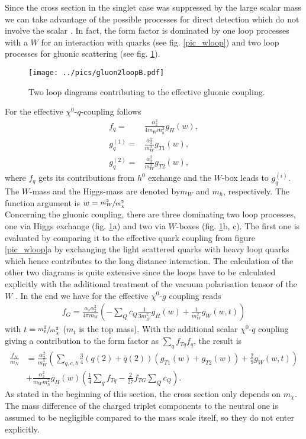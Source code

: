 Since the cross section in the singlet case was suppressed by the large scalar mass we can take advantage of the possible 
processes for direct detection which do not involve the scalar \cite{1004.4090}. In fact, the form factor is dominated by one loop processes with a 
$W$ for an interaction with quarks (see fig. \ref{pic_wloop}) and two loop processes for gluonic scattering (see fig. \ref{pic_2loopgluon}).
\begin{figure}[t]
 \texttt{[image: ../pics/gluon2loopB.pdf]}
 \caption{Two loop diagrams contributing to the effective gluonic coupling.}
 \label{pic_2loopgluon}
\end{figure}
For the effective $\chi^0$-$q$-coupling follows
\begin{align}
 f_q =& \frac{\alpha_2^2}{4m_W m_{h}^2} g_H(w),\\
 g^{(1)}_q =& \frac{\alpha_2^2}{m_W^3}g_{T1}(w),\\
 g^{(2)}_q =&\frac{\alpha_2^2}{m_W^3}g_{T2}(w), 
\end{align}
where $f_q$ gets its contributions from $h^0$ exchange and the $W$-box leads to $g^{(i)}_q$. The $W$-mass and the Higgs-mass are denoted by$m_W$ and 
$m_h$, respectively. The function argument is $w=\sfrac{m_W^2}{m_\chi^2}$ \\
\noindent Concerning the gluonic coupling, there are three dominating two loop processes, one via Higgs exchange (fig. \ref{pic_2loopgluon}a) and two
via $W$-boxes (fig. \ref{pic_2loopgluon}b, c). The first one is evaluated by comparing it to the effective quark coupling from figure \ref{pic_wloop}a
by exchanging the light scattered quarks with heavy loop quarks which hence contributes to the long distance interaction. 
The calculation of the other two diagrams is quite extensive since the loops have to be calculated explicitly with the additional treatment of the vacuum 
polarisation tensor of the $W$ \cite{1007.2601}. In the end we have for the effective $\chi^0$-$g$ coupling reads
\begin{align}
 f_G = \frac{\alpha_s\alpha_2^2}{4\pi m_W}\left(-\sum\limits_Q c_Q \frac{1}{3m_{h^0}^2} g_H(w) + \frac{1}{m_W^2} g_{W}(w,t) \right)
\end{align}
with $t=\sfrac{m_t^2}{m_\chi^2}$ ($m_t$ is the top mass).
With the additional scalar $\chi^0$-$q$ coupling giving a contribution to the form factor as $\sum_qf_{Tq}f_q$, the result is
\begin{align}
 \frac{f_N}{m_N} &= \frac{\alpha_2^2}{m_W^3}\left(\sum\limits_{q,c,b} \frac34 \left(q(2)+\bar q(2)\right) \left(g_{T1}(w) + g_{T2}(w)\right) + \frac29g_W(w,t)\right) \\
 \nonumber
 &+ \frac{\alpha_2^2}{m_W m_h^2}g_H(w) \left(\frac14 \sum\limits_q f_{Tq} - \frac{2}{27}f_{TG}\sum\limits_Q c_Q \right).
\end{align}
As stated in the beginning of this section, the cross section only depends
on $m_\chi$. The mass difference of the charged triplet components to the neutral one is assumed to be negligible compared to the mass scale itself,
so they do not enter explicitly. 


